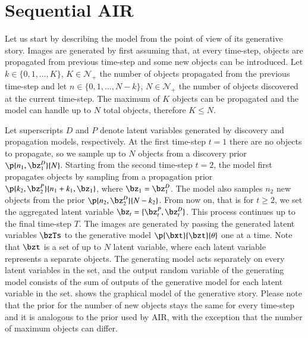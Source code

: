 \section{Sequential AIR}

Let us start by describing the model from the point of view of its generative story. Images are generated by first assuming that, at every time-step, objects are propagated from previous time-step and some new objects can be introduced. Let $k \in \{0, 1, \dots, K\}$, $K \in \mathcal{N}_+$ the number of objects propagated from the previous time-step and let $n \in \{0, 1, \dots, N - k\}$, $N \in \mathcal{N}_+$ the number of objects discovered at the current time-step. The maximum of $K$ objects can be propagated and the model can handle up to $N$ total objects, therefore $K \leq N$. 

Let superscripts $D$ and $P$ denote latent variables generated by discovery and propagation models, respectively. At the first time-step $t = 1$ there are no objects to propagate, so we sample up to $N$ objects from a discovery prior $\p{n_1, \bz_1^D}{N}$. Starting from the second time-step $t=2$, the model first propagates objects by sampling from a propagation prior $\p{k_2, \bz_2^P}{n_1 + k_1, \bz_1}$, where $\bz_1 = \bz_1^D$. The model also samples $n_2$ new objects from the prior $\p{n_2, \bz_2^D}{N - k_2}$. From now on, that is for $t \geq 2$, we set the aggregated latent variable $\bz_t = \{\bz_t^P, \bz_t^D\}$. This process continues up to the final time-step $T$. The images are generated by passing the generated latent variables $\bzTs$ to the generative model $\p{\bxt}{\bzt}{\theta}$ one at a time. Note that $\bzt$ is a set of up to $N$ latent variable, where each latent variable represents a separate objects. The generating model acts separately on every latent variables in the set, and the output random variable of the generating model consists of the sum of outputs of the generative model for each latent variable in the set.  shows the graphical model of the generative story. Please note that the prior for the number of new objects stays the same for every time-step and it is analogous to the prior used by AIR, with the exception that the number of maximum objects can differ.

